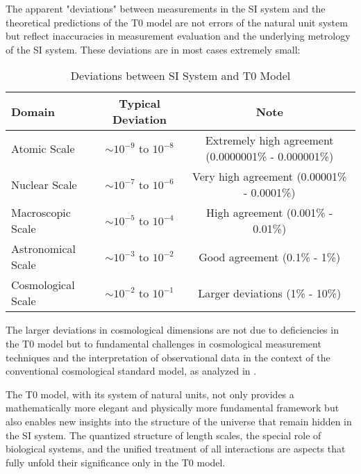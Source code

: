 \documentclass[12pt,a4paper]{article}
\begin{document}
	The apparent "deviations" between measurements in the SI system and the theoretical predictions of the T0 model are not errors of the natural unit system but reflect inaccuracies in measurement evaluation and the underlying metrology of the SI system. These deviations are in most cases extremely small:
	
	\begin{table}[H]
		\centering
		\begin{adjustbox}{width=0.95\textwidth}
			\begin{tabular}{lcc}
				\toprule
				\textbf{Domain} & \textbf{Typical Deviation} & \textbf{Note} \\
				\midrule
				Atomic Scale & $\sim10^{-9}$ to $10^{-8}$ & Extremely high agreement (0.0000001\% - 0.000001\%) \\
				Nuclear Scale & $\sim10^{-7}$ to $10^{-6}$ & Very high agreement (0.00001\% - 0.0001\%) \\
				Macroscopic Scale & $\sim10^{-5}$ to $10^{-4}$ & High agreement (0.001\% - 0.01\%) \\
				Astronomical Scale & $\sim10^{-3}$ to $10^{-2}$ & Good agreement (0.1\% - 1\%) \\
				Cosmological Scale & $\sim10^{-2}$ to $10^{-1}$ & Larger deviations (1\% - 10\%) \\
				\bottomrule
			\end{tabular}
		\end{adjustbox}
		\caption{Deviations between SI System and T0 Model}
		\label{tab:deviations}
	\end{table}
	
	The larger deviations in cosmological dimensions are not due to deficiencies in the T0 model but to fundamental challenges in cosmological measurement techniques and the interpretation of observational data in the context of the conventional cosmological standard model, as analyzed in \cite{pascher_messdifferenzen_2025}.
	
	The T0 model, with its system of natural units, not only provides a mathematically more elegant and physically more fundamental framework but also enables new insights into the structure of the universe that remain hidden in the SI system. The quantized structure of length scales, the special role of biological systems, and the unified treatment of all interactions are aspects that fully unfold their significance only in the T0 model.
	
\end{document}
